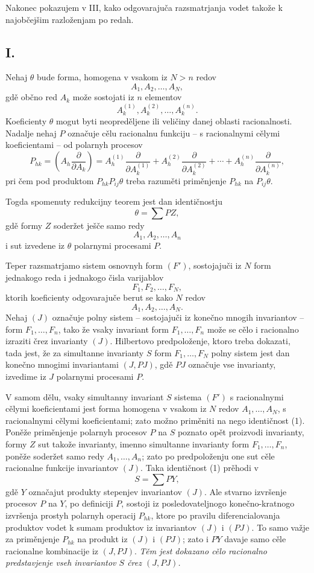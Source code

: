\documentclass[11pt]{article}
\begin{document}
Nakonec pokazujem v III, kako odgovarajuča razsmatrjanja vodet takože k najobčejšim razloženjam po redah.

\subsection*{I.}
Nehaj $\theta$ bude forma, homogena v vsakom iz $N>n$ redov
\[
  A_1,A_2,\ldots,A_N,
\]
gdě občno red $A_k$ može sostojati iz $n$ elementov
\[
  A_k^{(1)},A_k^{(2)},\ldots,A_k^{(n)}.
\]
Koeficienty $\theta$ mogut byti neopreděljene ili veličiny danej oblasti racionalnosti. Nadalje nehaj $P$ označuje cělu racionalnu funkciju -- s racionalnymi cělymi koeficientami -- od polarnyh procesov
\[
  P_{hk}=\left(A_h\frac{\partial}{\partial A_k}\right)
  =A_h^{(1)}\frac{\partial}{\partial A_k^{(1)}}+
   A_h^{(2)}\frac{\partial}{\partial A_k^{(2)}}+
   \cdots+
   A_h^{(n)}\frac{\partial}{\partial A_k^{(n)}},
\]
pri čem pod produktom $P_{hk}P_{ij}\theta$ treba razuměti priměnjenje $P_{hk}$ na $P_{ij}\theta$.

Togda spomenuty redukcijny teorem jest dan identičnostju
\begin{equation}
  \theta=\sum PZ,
\tag{1}
\end{equation}
gdě formy $Z$ soderžet ješče samo redy
\[
  A_1,A_2,\ldots,A_n
\]
i sut izvedene iz $\theta$ polarnymi procesami $P$.

Teper razsmatrjamo sistem osnovnyh form $(F')$, sostojajuči iz $N$ form jednakogo reda i jednakogo čisla varijablov
\[
  F_1,F_2,\ldots,F_N,
\]
ktorih koeficienty odgovarajuče berut se kako $N$ redov
\[
  A_1,A_2,\ldots,A_N.
\]
Nehaj $(J)$ označuje polny sistem -- sostojajuči iz konečno mnogih invariantov -- form $F_1,\ldots,F_n$, tako že vsaky invariant form $F_1,\ldots,F_n$ može se cělo i racionalno izraziti črez invarianty $(J)$. Hilbertovo predpoloženje, ktoro treba dokazati, tada jest, že za simultanne invarianty $S$ form $F_1,\ldots,F_N$ polny sistem jest dan konečno mnogimi invariantami $(J,PJ)$, gdě $PJ$ označuje vse invarianty, izvedime iz $J$ polarnymi procesami $P$.

V samom dělu, vsaky simultanny invariant $S$ sistema $(F')$ s racionalnymi cělymi koeficientami jest forma homogena v vsakom iz $N$ redov $A_1,\ldots,A_N$, s racionalnymi cělymi koeficientami; zato možno priměniti na nego identičnost (1). Poněže priměnjenje polarnyh procesov $P$ na $S$ poznato opět proizvodi invarianty, formy $Z$ sut takože invarianty, imenno simultanne invarianty form $F_1,\ldots,F_n$, poněže soderžet samo redy $A_1,\ldots,A_n$; zato po predpoloženju one sut cěle racionalne funkcije invariantov $(J)$. Taka identičnost (1) prěhodi v
\[
  S=\sum PY,
\]
gdě $Y$ označajut produkty stepenjev invariantov $(J)$. Ale stvarno izvršenje procesov $P$ na $Y$, po definiciji $P$, sostoji iz posledovateljnogo konečno-kratnogo izvršenja prostyh polarnyh operacij $P_{hk}$, ktore po pravilu diferencialovanja produktov vodet k sumam produktov iz invariantov $(J)$ i $(PJ)$. To samo važje za priměnjenje $P_{hk}$ na produkt iz $(J)$ i $(PJ)$; zato i $PY$ davaje samo cěle racionalne kombinacije iz $(J,PJ)$. {\itshape Těm jest dokazano cělo racionalno predstavjenje vseh invariantov $S$ črez $(J,PJ)$.}
\end{document}
